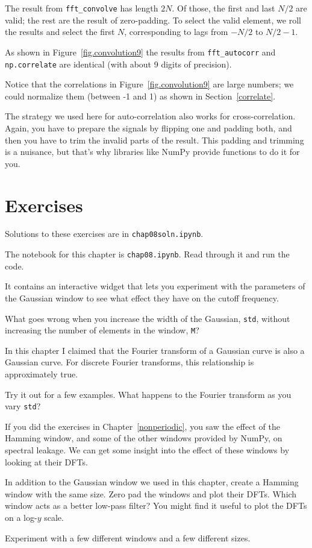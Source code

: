 \documentclass[12pt]{book}
\begin{document}
The result from \verb"fft_convolve" has length $2N$.  Of those,
the first and last $N/2$ are valid; the rest are the result of
zero-padding.  To select the valid element, we roll the results
and select the first $N$, corresponding to lags from $-N/2$ to
$N/2-1$.

As shown in Figure~\ref{fig.convolution9} the results from
\verb"fft_autocorr" and {\tt np.correlate} are identical (with
about 9 digits of precision).

Notice that the correlations in Figure~\ref{fig.convolution9} are
large numbers; we could normalize them (between -1 and 1) as shown
in Section~\ref{correlate}.

The strategy we used here for auto-correlation also works for
cross-correlation.  Again, you have to prepare the signals by flipping
one and padding both, and then you have to trim the invalid parts of
the result.  This padding and trimming is a nuisance, but that's why
libraries like NumPy provide functions to do it for you.


\section{Exercises}

Solutions to these exercises are in {\tt chap08soln.ipynb}.

\begin{exercise}
The notebook for this chapter is {\tt chap08.ipynb}.
Read through it and run the code.

It contains an interactive widget that lets you
experiment with the parameters of the Gaussian window to see
what effect they have on the cutoff frequency.

What goes wrong when you increase the width of the Gaussian,
{\tt std}, without increasing the number of elements in the window,
{\tt M}?
\end{exercise}


\begin{exercise}
In this chapter I claimed that the Fourier transform of a Gaussian
curve is also a Gaussian curve.  For discrete Fourier transforms,
this relationship is approximately true.

Try it out for a few examples.  What happens to the Fourier transform
as you vary {\tt std}?
\end{exercise}


\begin{exercise}
If you did the exercises in Chapter~\ref{nonperiodic}, you saw the
effect of the Hamming window, and some of the other windows provided
by NumPy, on spectral leakage.  We can get some insight into the
effect of these windows by looking at their DFTs.

In addition to the Gaussian window we used in this chapter, create a
Hamming window with the same size.  Zero pad the windows and plot
their DFTs.  Which window acts as a better low-pass filter?  You might
find it useful to plot the DFTs on a log-$y$ scale.

Experiment with a few different windows and a few different sizes.
\end{exercise}
\end{document}
